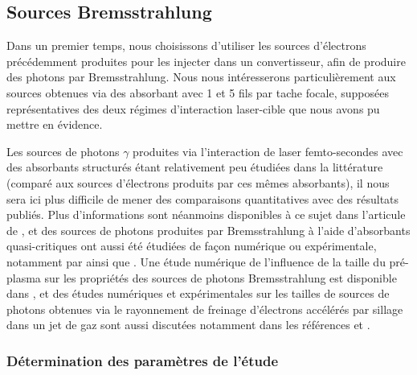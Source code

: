 \begin{refsection}
\subsection{Sources Bremsstrahlung}

Dans un premier temps, nous choisissons d'utiliser les sources d'électrons précédemment produites pour les injecter dans un convertisseur, afin de produire des photons par Bremsstrahlung. Nous nous intéresserons particulièrement aux sources obtenues via des absorbant avec 1 et 5 fils par tache focale, supposées représentatives des deux régimes d'interaction laser-cible que nous avons pu mettre en évidence.

Les sources de photons $\gamma$ produites via l'interaction de laser femto-secondes avec des absorbants structurés étant relativement peu étudiées dans la littérature (comparé aux sources d'électrons produits par ces mêmes absorbants), il nous sera ici plus difficile de mener des comparaisons quantitatives avec des résultats publiés. Plus d'informations sont néanmoins disponibles à ce sujet dans l'articule de \cite{jiang_2014a}, et des sources de photons produites par Bremsstrahlung à l'aide d'absorbants quasi-critiques ont aussi été étudiées de façon numérique ou expérimentale, notamment par \cite{lobok_2019} ainsi que \cite{rosmej_2019a}. Une étude numérique de l'influence de la taille du pré-plasma sur les propriétés des sources de photons Bremsstrahlung est disponible dans \cite{brantov_2016}, et des études numériques et expérimentales sur les tailles de sources de photons obtenues via le rayonnement de freinage d'électrons accélérés par sillage dans un jet de gaz sont aussi discutées notamment dans les références \cite{ben-ismail_2011} et \cite{glinec_2005}. 

\subsubsection{Détermination des paramètres de l'étude}


\end{refsection}
